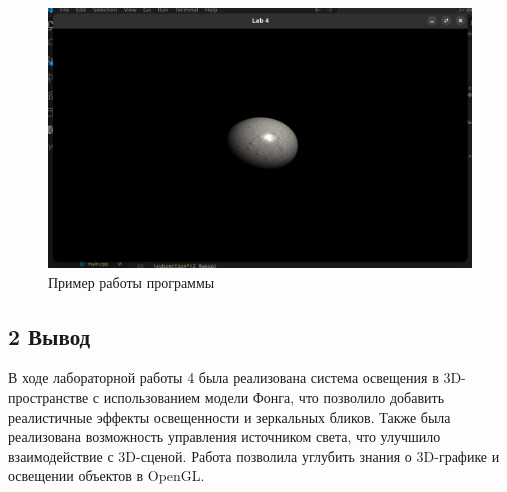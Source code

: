 \documentclass[12pt]{article}
\begin{document}
\begin{figure}[h]

\centering
        
\includegraphics[width=0.8\linewidth]{image.png}
        
\caption{Пример работы программы}
        
\label{fig:mpr}
        
\end{figure}

\subsection*{2 Вывод}
В ходе лабораторной работы 4 была реализована система освещения в 3D-пространстве с использованием модели Фонга, что позволило добавить реалистичные эффекты освещенности и зеркальных бликов. 
Также была реализована возможность управления источником света, что улучшило взаимодействие с 3D-сценой. 
Работа позволила углубить знания о 3D-графике и освещении объектов в OpenGL.
\end{document}
